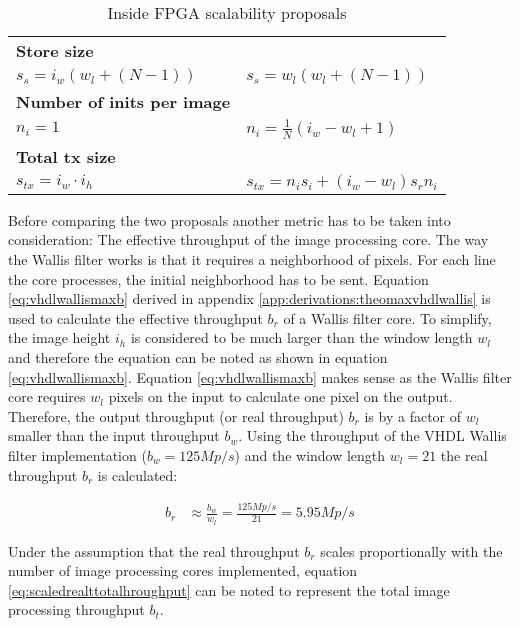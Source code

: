 \begin{table}[h!]
\begin{tabular}{p{} p{}}
        \textbf{Store size} & \\
        {\( 
            s_s  = i_w(w_l+(N-1))
        \)}
        &
        {\( 
            s_s  = w_l(w_l+(N-1))
        \)}
        \\\midrule
        \textbf{Number of inits per image} & \\
        {\( 
            n_i  = 1
        \)}
        &
        {\( 
            n_i  = \frac{1}{N}(i_w-w_l+1)
        \)}
        \\\midrule
        \textbf{Total tx size} & \\
        {\( 
            s_{tx}  = i_w \cdot i_h
        \)}
        &
        {\( 
            s_{tx}  = n_i s_i + (i_w-w_l)s_r n_i
        \)}
        \\
        \bottomrule
    \end{tabular}
    \caption{Inside FPGA scalability proposals}
    \label{tab:insidefpgascalability}
\end{table}

\clearpage

Before comparing the two proposals another metric has to be taken into
consideration: The effective throughput of the image processing core. The way
the Wallis filter works is that it requires a neighborhood of pixels. For each
line the core processes, the initial neighborhood has to be sent. Equation
\ref{eq:vhdlwallismaxb} derived in appendix 
\ref{app:derivations:theomaxvhdlwallis} is used to calculate the effective
throughput $b_r$ of a Wallis filter core. To simplify, the image height $i_h$ is
considered to be much larger than the window length $w_l$ and therefore the
equation can be noted as shown in equation \ref{eq:vhdlwallismaxb}.
Equation \ref{eq:vhdlwallismaxb} makes sense as the Wallis filter core
requires $w_l$ pixels on the input to calculate one pixel on the output.
Therefore, the output throughput (or real throughput) $b_r$ is by a factor of $w_l$
smaller than the input throughput $b_w$. Using the
throughput of the VHDL Wallis filter implementation ($b_w=125Mp/s$) and the
window length $w_l=21$ the real throughput $b_r$ is calculated:

\begin{align}
    b_r  & \approx \frac{b_w}{w_l} = \frac{125Mp/s}{21} = 5.95 Mp/s
    \label{eq:vhdlwallismaxb}
\end{align}

Under the assumption that the real throughput $b_r$ scales proportionally with the
number of image processing cores implemented, equation 
\ref{eq:scaledrealttotalhroughput} can be noted to represent the total image
processing throughput $b_t$.

